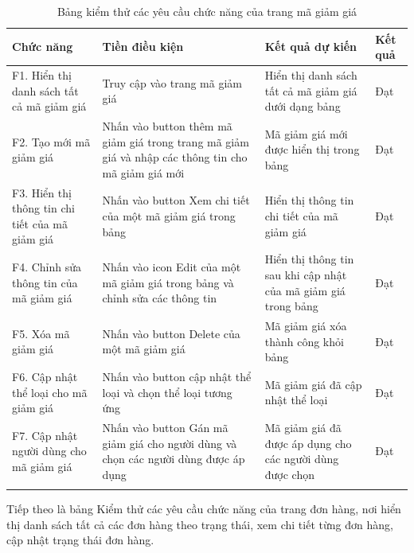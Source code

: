 \begin{longtable}{|p{4cm}|p{4cm}|p{4cm}|p{2cm}|}
    \hline
    Chức năng & Tiền điều kiện & Kết quả dự kiến & Kết quả \\
    \hline
    F1. Hiển thị danh sách tất cả mã giảm giá & Truy cập vào trang mã giảm giá & Hiển thị danh sách tất cả mã giảm giá dưới dạng bảng & Đạt\\
    \hline
     F2. Tạo mới mã giảm giá & Nhấn vào button thêm mã giảm giá trong trang mã giảm giá và nhập các thông tin cho mã giảm giá mới & Mã giảm giá mới được hiển thị trong bảng & Đạt\\
    \hline
     F3. Hiển thị thông tin chi tiết của mã giảm giá & Nhấn vào button Xem chi tiết của một mã giảm giá trong bảng  & Hiển thị thông tin chi tiết của mã giảm giá & Đạt\\
     \hline
     F4. Chỉnh sửa thông tin của mã giảm giá & Nhấn vào icon Edit của một mã giảm giá trong bảng và chỉnh sửa các thông tin & Hiển thị thông tin sau khi cập nhật của mã giảm giá trong bảng & Đạt\\
     \hline
     F5. Xóa mã giảm giá & Nhấn vào button Delete của một mã giảm giá & Mã giảm giá xóa thành công khỏi bảng & Đạt \\
     \hline
     F6. Cập nhật thể loại cho mã giảm giá & Nhấn vào button cập nhật thể loại và chọn thể loại tương ứng & Mã giảm giá đã cập nhật thể loại & Đạt\\
     \hline
     F7. Cập nhật người dùng cho mã giảm giá & Nhấn vào button Gán mã giảm giá cho người dùng và chọn các người dùng được áp dụng & Mã giảm giá đã được áp dụng cho các người dùng được chọn & Đạt \\
    \hline
    \caption{Bảng kiểm thử các yêu cầu chức năng của trang mã giảm giá}
\end{longtable}
Tiếp theo là bảng Kiểm thử các yêu cầu chức năng của trang đơn hàng, nơi hiển thị danh sách tất cả các đơn hàng theo trạng thái, xem chi tiết từng đơn hàng, cập nhật trạng thái đơn hàng.
